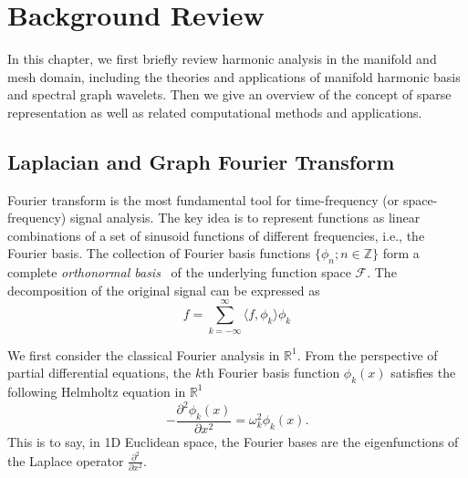 \chapter{Background Review}
In this chapter, we first briefly review harmonic analysis in the manifold and mesh domain,
including the theories and applications of manifold harmonic basis and spectral graph wavelets.
Then we give an overview of the concept of sparse representation as well as related
computational methods and applications.

\section{Laplacian and Graph Fourier Transform}
Fourier transform is the most fundamental tool for time-frequency (or space-frequency)
signal analysis. The key idea is to represent functions as linear combinations of a
set of sinusoid functions of different frequencies, i.e., the Fourier basis. The collection
of Fourier basis functions $\{\phi_n;n\in \mathbb{Z}\}$ form a complete
\textsl{orthonormal basis}~\cite{Gomes:1999} of the underlying function space $\mathcal{F}$.
The decomposition of the original signal can be expressed as
\begin{equation}
f=\sum_{k=-\infty}^\infty \langle f,\phi_k\rangle\phi_k
\end{equation}

We first consider the classical Fourier analysis in $\mathbb{R}^1$. From the perspective of
partial differential equations, the $k$th Fourier basis function $\phi_k(x)$
satisfies the following Helmholtz equation in $\mathbb{R}^1$
\begin{equation}\label{eq:Helmholtz1D}
-\frac{\partial^2 \phi_k(x)}{\partial x^2}=\omega_k^2 \phi_k(x).
\end{equation}
This is to say, in 1D Euclidean space, the Fourier bases are the eigenfunctions of the Laplace
operator $\frac{\partial^2}{\partial x^2}$.

